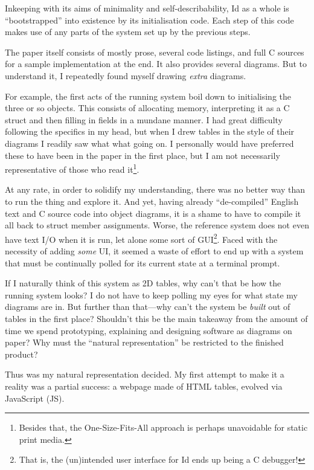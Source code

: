 Inkeeping with its aims of minimality and self-describability, Id as a
whole is ``bootstrapped'' into existence by its initialisation code.
Each step of this code makes use of any parts of the system set up by
the previous steps.

The paper itself consists of mostly prose, several code listings, and
full C sources for a sample implementation at the end. It also provides
several diagrams. But to understand it, I repeatedly found myself
drawing \emph{extra} diagrams.

For example, the first acts of the running system boil down to
initialising the three or so objects. This consists of allocating
memory, interpreting it as a C struct and then filling in fields in a
mundane manner. I had great difficulty following the specifics in my
head, but when I drew tables in the style of their diagrams I readily
saw what what going on. I personally would have preferred these to have
been in the paper in the first place, but I am not necessarily
representative of those who read it\footnote{Besides that, the
  One-Size-Fits-All{} approach is perhaps unavoidable for static print
  media.}.

At any rate, in order to solidify my understanding, there was no better
way than to run the thing and explore it. And yet, having already
``de-compiled'' English text and C source code into object diagrams, it
is a shame to have to compile it all back to struct member assignments.
Worse, the reference system does not even have text I/O when it is run,
let alone some sort of GUI\footnote{That is, the (un)intended user
  interface for Id ends up being a C debugger!}. Faced with the
necessity of adding \emph{some} UI, it seemed a waste of effort to end
up with a system that must be continually polled for its current state
at a terminal prompt.

If I naturally think of this system as 2D tables, why can't that be how
the running system looks? I do not have to keep polling my eyes for what
state my diagrams are in. But further than that---why can't the system
be \emph{built} out of tables in the first place? Shouldn't this be the
main takeaway from the amount of time we spend prototyping, explaining
and designing software as diagrams on paper? Why must the ``natural
representation'' be restricted to the finished product?

Thus was my natural representation decided. My first attempt to make it
a reality was a partial success: a webpage made of HTML tables, evolved
via JavaScript (JS).

